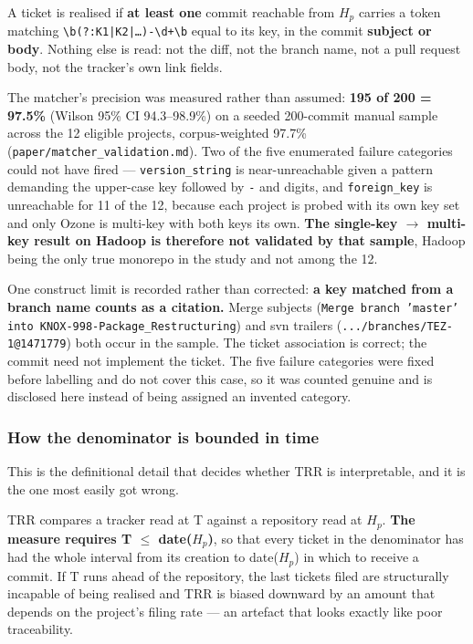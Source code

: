 \documentclass[11pt,a4paper]{article}
\begin{document}
A ticket is realised if \textbf{at least one} commit reachable from $H_p$ carries a token matching \texttt{\textbackslash{}b(?:K1|K2|\ldots{})-\allowbreak{}\textbackslash{}d+\textbackslash{}b} equal to its key, in the commit \textbf{subject or body}. Nothing else is read: not the diff, not the branch name, not a pull request body, not the tracker's own link fields.

The matcher's precision was measured rather than assumed: \textbf{195 of 200 = 97.5\%} (Wilson 95\% CI 94.3--98.9\%) on a seeded 200-commit manual sample across the 12 eligible projects, corpus-weighted 97.7\% (\texttt{paper/\allowbreak{}matcher\_\allowbreak{}validation.\allowbreak{}md}). Two of the five enumerated failure categories could not have fired --- \texttt{version\_\allowbreak{}string} is near-unreachable given a pattern demanding the upper-case key followed by \texttt{-\allowbreak{}} and digits, and \texttt{foreign\_\allowbreak{}key} is unreachable for 11 of the 12, because each project is probed with its own key set and only Ozone is multi-key with both keys its own. \textbf{The single-key $\rightarrow$ multi-key result on Hadoop is therefore not validated by that sample}, Hadoop being the only true monorepo in the study and not among the 12.

One construct limit is recorded rather than corrected: \textbf{a key matched from a branch name counts as a citation.} Merge subjects (\texttt{Merge branch 'master' into KNOX-\allowbreak{}998-\allowbreak{}Package\_\allowbreak{}Restructuring}) and svn trailers (\texttt{.\allowbreak{}.\allowbreak{}.\allowbreak{}/\allowbreak{}branches/\allowbreak{}TEZ-\allowbreak{}1@1471779}) both occur in the sample. The ticket association is correct; the commit need not implement the ticket. The five failure categories were fixed before labelling and do not cover this case, so it was counted genuine and is disclosed here instead of being assigned an invented category.

\subsubsection{How the denominator is bounded in time}
\label{sec:3.1.3}

This is the definitional detail that decides whether TRR is interpretable, and it is the one most easily got wrong.

TRR compares a tracker read at T against a repository read at $H_p$. \textbf{The measure requires T $\leq$ date($H_p$)}, so that every ticket in the denominator has had the whole interval from its creation to date($H_p$) in which to receive a commit. If T runs ahead of the repository, the last tickets filed are structurally incapable of being realised and TRR is biased downward by an amount that depends on the project's filing rate --- an artefact that looks exactly like poor traceability.
\end{document}
